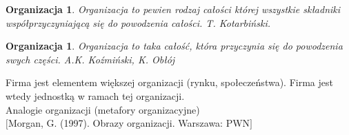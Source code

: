 \documentclass[a4paper,10pt]{report}
\begin{document}
\newtheorem{Organizacja 1}{Organizacja}
\begin{Organizacja 1}
Organizacja to pewien rodzaj całości której wszystkie składniki współprzyczyniającą się do powodzenia całości. T. Kotarbiński.
\end{Organizacja 1}

\newtheorem{Organizacja 2}{Organizacja}
\begin{Organizacja 2}
Organizacja to taka całość, która przyczynia się do powodzenia swych części. A.K. Koźmiński, K. Obłój
\end{Organizacja 2}

Firma jest elementem większej organizacji (rynku, społeczeństwa). Firma jest wtedy jednostką w ramach tej organizacji.\\

Analogie organizacji (metafory organizacyjne) \\
$[$Morgan, G. (1997). Obrazy organizacji. Warszawa: PWN$]$
\end{document}
